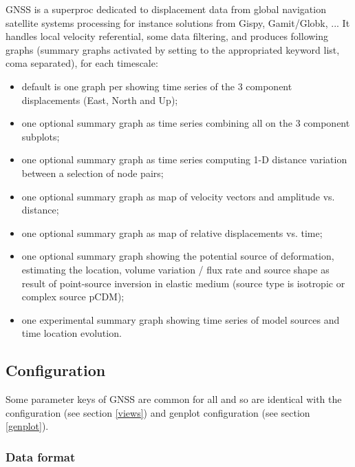 GNSS is a superproc dedicated to displacement data from global navigation satellite systems processing for instance solutions from Gispy, Gamit/Globk, ... It handles local velocity referential, some data filtering, and produces following graphs (summary graphs activated by setting  to the appropriated keyword list, coma separated), for each timescale:
\begin{itemize}
\item default is one graph per  showing time series of the 3 component displacements (East, North and Up);
\item one optional summary graph  as time series combining all  on the 3 component subplots;
\item one optional summary graph  as time series computing 1-D distance variation between a selection of node pairs;
\item one optional summary graph  as map of velocity vectors and amplitude vs. distance;
\item one optional summary graph  as map of relative displacements vs. time;
\item one optional summary graph  showing the potential source of deformation, estimating the location, volume variation / flux rate and source shape as result of point-source inversion in elastic medium (source type is isotropic or complex source pCDM);
\item one experimental summary graph  showing time series of model sources and time location evolution.
\end{itemize}


\subsection{Configuration}

Some parameter keys of GNSS are common for all  and  so are identical with the  configuration (see section \ref{views}) and genplot  configuration (see section \ref{genplot}).


\subsubsection{Data format}

